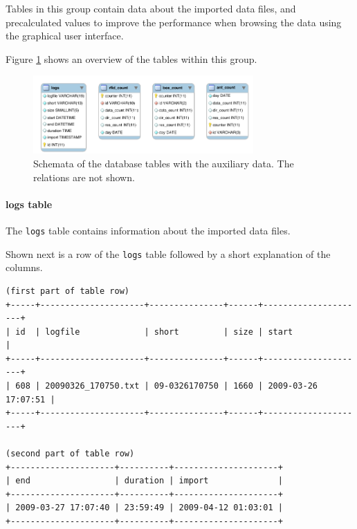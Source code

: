 Tables in this group contain data about the imported data files, and precalculated values to improve the performance when browsing the data using the graphical user interface.

Figure \ref{fig:auxiliary_tables} shows an overview of the tables within this group. 


\begin{figure}[htpb]
\begin{center}
  \includegraphics[width=0.75\textwidth]{assets/pdf/auxiliary_tables_schema.pdf}
  \caption[Schema of database tables with system member data]{Schemata of the database tables with the auxiliary data. The relations are not shown.}
  \label{fig:auxiliary_tables}
\end{center}
\end{figure}

\paragraph{logs table}
\label{para:logs_table} 

The \lstinline|logs| table contains information about the imported data files.

Shown next is a row of the \lstinline|logs| table followed by a short explanation of the columns.

\codescript
\begin{lstlisting}[frame=none]
(first part of table row)
+-----+---------------------+---------------+------+---------------------+
| id  | logfile             | short         | size | start               |
+-----+---------------------+---------------+------+---------------------+
| 608 | 20090326_170750.txt | 09-0326170750 | 1660 | 2009-03-26 17:07:51 |
+-----+---------------------+---------------+------+---------------------+

(second part of table row)
+---------------------+----------+---------------------+
| end                 | duration | import              |
+---------------------+----------+---------------------+
| 2009-03-27 17:07:40 | 23:59:49 | 2009-04-12 01:03:01 | 
+---------------------+----------+---------------------+

\end{lstlisting}

